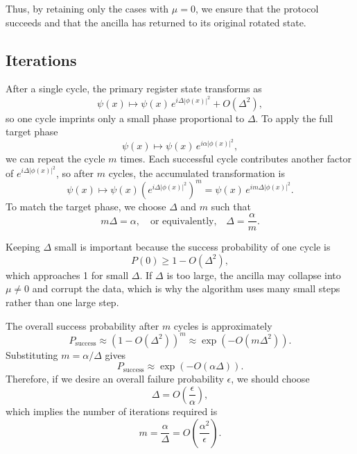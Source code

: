 \documentclass[12pt,a4paper]{article}
\begin{document}
Thus, by retaining only the cases with $\mu = 0$, we ensure that the protocol succeeds and that the ancilla has returned to its original rotated state.

\subsection{Iterations}
After a single cycle, the primary register state transforms as 
\begin{equation}
\psi(x) \mapsto \psi(x) \, e^{i \Delta |\phi(x)|^2} + O(\Delta^2),
\end{equation}
so one cycle imprints only a small phase proportional to $\Delta$. To apply the full target phase 
\begin{equation}
\psi(x) \mapsto \psi(x) \, e^{i \alpha |\phi(x)|^2},
\end{equation}
we can repeat the cycle $m$ times. Each successful cycle contributes another factor of $e^{i \Delta |\phi(x)|^2}$, so after $m$ cycles, the accumulated transformation is
\begin{equation}
\psi(x) \mapsto \psi(x) \left(e^{i \Delta |\phi(x)|^2}\right)^m = \psi(x) \, e^{i m \Delta |\phi(x)|^2}.
\end{equation}
To match the target phase, we choose $\Delta$ and $m$ such that
\begin{equation}
m \Delta = \alpha, \quad \text{or equivalently,} \quad \Delta = \frac{\alpha}{m}.
\end{equation}

Keeping $\Delta$ small is important because the success probability of one cycle is
\begin{equation}
P(0) \ge 1 - O(\Delta^2),
\end{equation}
which approaches 1 for small $\Delta$. If $\Delta$ is too large, the ancilla may collapse into $\mu \neq 0$ and corrupt the data, which is why the algorithm uses many small steps rather than one large step.  

The overall success probability after $m$ cycles is approximately
\begin{equation}
P_{\text{success}} \approx (1 - O(\Delta^2))^m \approx \exp(-O(m \Delta^2)).
\end{equation}
Substituting $m = \alpha / \Delta$ gives
\begin{equation}
P_{\text{success}} \approx \exp(-O(\alpha \Delta)).
\end{equation}
Therefore, if we desire an overall failure probability $\epsilon$, we should choose
\begin{equation}
\Delta = O\left(\frac{\epsilon}{\alpha}\right),
\end{equation}
which implies the number of iterations required is
\begin{equation}
m = \frac{\alpha}{\Delta} = O\left(\frac{\alpha^2}{\epsilon}\right).
\end{equation}
\end{document}

